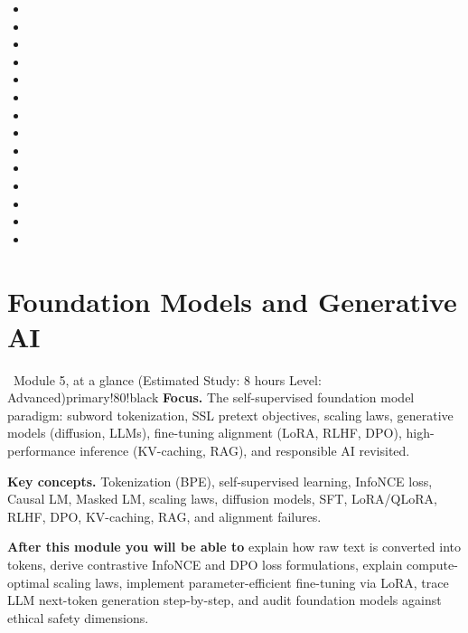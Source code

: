 \documentclass[11pt,a4paper]{article}
\begin{document}
	\begin{sourcesbox}
		\small
		\begin{itemize}[nosep]
			\item {}
			\item {}
			\item {}
			\item {}
			\item {}
			\item {}
			\item {}
			\item {}
			\item {}
			\item {}
			\item {}
			\item {}
			\item {}
			\item {}
		\end{itemize}
	\end{sourcesbox}

	\clearpage
	\section{Foundation Models and Generative AI}
	
	\begin{modulecard}{\faRobot\ Module 5, at a glance \hfill \small\normalfont (Estimated Study: 8 hours \textbullet{} Level: Advanced)}{primary!80!black}
		\textbf{Focus.} The self-supervised foundation model paradigm: subword tokenization, SSL pretext objectives, scaling laws, generative models (diffusion, LLMs), fine-tuning alignment (LoRA, RLHF, DPO), high-performance inference (KV-caching, RAG), and responsible AI revisited.
		
		\medskip
		\textbf{Key concepts.} Tokenization (BPE), self-supervised learning, InfoNCE loss, Causal LM, Masked LM, scaling laws, diffusion models, SFT, LoRA/QLoRA, RLHF, DPO, KV-caching, RAG, and alignment failures.
		
		\medskip
		\textbf{After this module you will be able to} explain how raw text is converted into tokens, derive contrastive InfoNCE and DPO loss formulations, explain compute-optimal scaling laws, implement parameter-efficient fine-tuning via LoRA, trace LLM next-token generation step-by-step, and audit foundation models against ethical safety dimensions.
	\end{modulecard}
	
\end{document}
